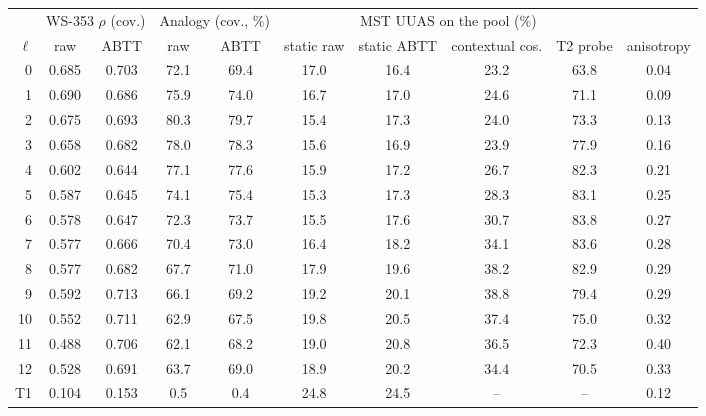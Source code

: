 \begin{tabular}{rccccccccc}
\toprule
 & \multicolumn{2}{c}{WS-353 $\rho$ (cov.)} & \multicolumn{2}{c}{Analogy (cov., \%)} & \multicolumn{4}{c}{MST UUAS on the pool (\%)} & \\
\cmidrule(lr){2-3}\cmidrule(lr){4-5}\cmidrule(lr){6-9}
$\ell$ & raw & ABTT & raw & ABTT & static raw & static ABTT & contextual cos. & T2 probe & anisotropy \\
\midrule
0 & 0.685 & 0.703 & 72.1 & 69.4 & 17.0 & 16.4 & 23.2 & 63.8 & 0.04 \\
1 & 0.690 & 0.686 & 75.9 & 74.0 & 16.7 & 17.0 & 24.6 & 71.1 & 0.09 \\
2 & 0.675 & 0.693 & 80.3 & 79.7 & 15.4 & 17.3 & 24.0 & 73.3 & 0.13 \\
3 & 0.658 & 0.682 & 78.0 & 78.3 & 15.6 & 16.9 & 23.9 & 77.9 & 0.16 \\
4 & 0.602 & 0.644 & 77.1 & 77.6 & 15.9 & 17.2 & 26.7 & 82.3 & 0.21 \\
5 & 0.587 & 0.645 & 74.1 & 75.4 & 15.3 & 17.3 & 28.3 & 83.1 & 0.25 \\
6 & 0.578 & 0.647 & 72.3 & 73.7 & 15.5 & 17.6 & 30.7 & 83.8 & 0.27 \\
7 & 0.577 & 0.666 & 70.4 & 73.0 & 16.4 & 18.2 & 34.1 & 83.6 & 0.28 \\
\rowcolor{black!8} 8 & 0.577 & 0.682 & 67.7 & 71.0 & 17.9 & 19.6 & 38.2 & 82.9 & 0.29 \\
9 & 0.592 & 0.713 & 66.1 & 69.2 & 19.2 & 20.1 & 38.8 & 79.4 & 0.29 \\
10 & 0.552 & 0.711 & 62.9 & 67.5 & 19.8 & 20.5 & 37.4 & 75.0 & 0.32 \\
11 & 0.488 & 0.706 & 62.1 & 68.2 & 19.0 & 20.8 & 36.5 & 72.3 & 0.40 \\
12 & 0.528 & 0.691 & 63.7 & 69.0 & 18.9 & 20.2 & 34.4 & 70.5 & 0.33 \\
\midrule
T1 & 0.104 & 0.153 & 0.5 & 0.4 & 24.8 & 24.5 & -- & -- & 0.12 \\
\bottomrule
\end{tabular}
